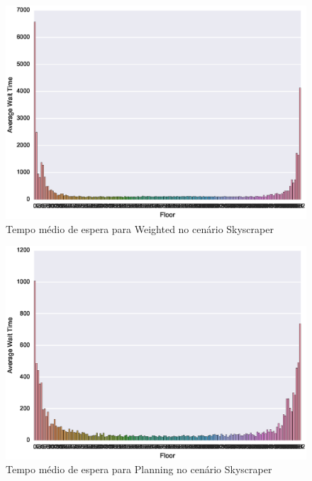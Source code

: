 \begin{figure}[htb!]
  \centering
  \includegraphics[scale=0.8]{img/results/Skyscraper/4_Simple_Weighted/averageWaitTime}
  \caption{Tempo médio de espera para Weighted no cenário Skyscraper}
  \label{fig:result:skyscraper:avgwt:weighted}
\end{figure}

\begin{figure}[htb!]
  \centering
  \includegraphics[scale=0.8]{img/results/Skyscraper/5_Planning_Random/averageWaitTime}
  \caption{Tempo médio de espera para Planning no cenário Skyscraper}
  \label{fig:result:skyscraper:avgwt:planning}
\end{figure}